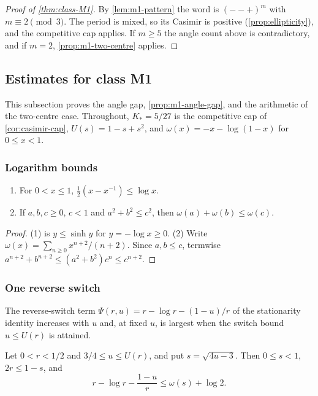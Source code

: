 \begin{proof}[Proof of \cref{thm:class-M1}]
  By \cref{lem:m1-pattern} the word is $(--+)^m$ with $m\equiv2\pmod3$. The period is mixed, so its
  Casimir is positive (\cref{prop:ellipticity}), and the competitive cap applies. If $m\ge5$ the
  angle count above is contradictory, and if $m=2$, \cref{prop:m1-two-centre} applies.
\end{proof}

\subsection{Estimates for class M1}\label{app:short-run-estimates}

This subsection proves the angle gap, \cref{prop:m1-angle-gap}, and the arithmetic of the two-centre
case. Throughout, $K_*=5/27$ is the competitive cap of \cref{cor:casimir-cap},
$U(s)=1-s+s^2$, and $\omega(x)=-x-\log(1-x)$ for $0\le x<1$.

\subsubsection{Logarithm bounds}

\begin{lemma}\label{lem:m1-log}
  \begin{enumerate}[label=\textup{(\arabic*)}]
    \item For $0<x\le1$, $\frac12(x-x^{-1})\le\log x$.
    \item If $a,b,c\ge0$, $c<1$ and $a^2+b^2\le c^2$, then $\omega(a)+\omega(b)\le\omega(c)$.
  \end{enumerate}
\end{lemma}

\begin{proof}
  (1) is $y\le\sinh y$ for $y=-\log x\ge0$. (2) Write
  $\omega(x)=\sum_{n\ge0}x^{n+2}/(n+2)$. Since
  $a,b\le c$, termwise $a^{n+2}+b^{n+2}\le(a^2+b^2)c^n\le c^{n+2}$.
\end{proof}

\subsubsection{One reverse switch}

The reverse-switch term $\Psi(r,u)=r-\log r-(1-u)/r$ of the stationarity identity increases with
$u$ and, at fixed $u$, is largest when the switch bound $u\le U(r)$ is attained.

\begin{lemma}\label{lem:m1-one-switch}
  Let $0<r<1/2$ and $3/4\le u\le U(r)$, and put $s=\sqrt{4u-3}$. Then $0\le s<1$, $2r\le 1-s$, and
  \[
    r-\log r-\frac{1-u}r\le\omega(s)+\log2 .
  \]
\end{lemma}

